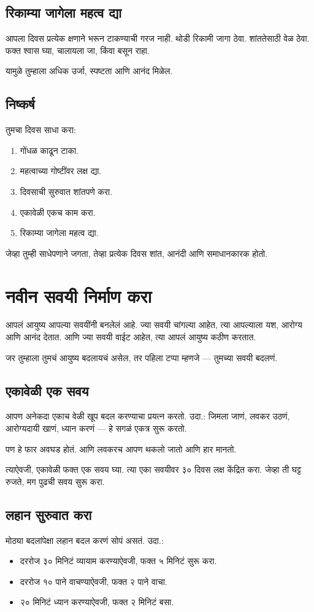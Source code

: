 \section*{रिकाम्या जागेला महत्व द्या}
आपला दिवस प्रत्येक क्षणाने भरून टाकण्याची गरज नाही.  
थोडी रिकामी जागा ठेवा.  
शांततेसाठी वेळ ठेवा.  
फक्त श्वास घ्या, चालायला जा, किंवा बसून राहा.  

यामुळे तुम्हाला अधिक उर्जा, स्पष्टता आणि आनंद मिळेल.  

\section*{निष्कर्ष}
तुमचा दिवस साधा करा:  
\begin{enumerate}
\item गोंधळ काढून टाका.  
\item महत्वाच्या गोष्टींवर लक्ष द्या.  
\item दिवसाची सुरुवात शांतपणे करा.  
\item एकावेळी एकच काम करा.  
\item रिकाम्या जागेला महत्व द्या.  
\end{enumerate}

जेव्हा तुम्ही साधेपणाने जगता,  
तेव्हा प्रत्येक दिवस शांत, आनंदी आणि समाधानकारक होतो.  



\chapter{नवीन सवयी निर्माण करा}

आपलं आयुष्य आपल्या सवयींनी बनलेलं आहे.  
ज्या सवयी चांगल्या आहेत, त्या आपल्याला यश, आरोग्य आणि आनंद देतात.  
आणि ज्या सवयी वाईट आहेत, त्या आपलं आयुष्य कठीण करतात.  

जर तुम्हाला तुमचं आयुष्य बदलायचं असेल,  
तर पहिला टप्पा म्हणजे — तुमच्या सवयी बदलणं.  

\section*{एकावेळी एक सवय}
आपण अनेकदा एकाच वेळी खूप बदल करण्याचा प्रयत्न करतो.  
उदा.:  
जिमला जाणं, लवकर उठणं,  
आरोग्यदायी खाणं, ध्यान करणं — हे सगळं एकत्र सुरू करतो.  

पण हे फार अवघड होतं.  
आणि लवकरच आपण थकलो जातो आणि हार मानतो.  

त्याऐवजी, एकावेळी फक्त एक सवय घ्या.  
त्या एका सवयीवर ३० दिवस लक्ष केंद्रित करा.  
जेव्हा ती घट्ट रुजते,  
मग पुढची सवय सुरू करा.  

\section*{लहान सुरुवात करा}
मोठ्या बदलांपेक्षा लहान बदल करणं सोपं असतं.  
उदा.:  
\begin{itemize}
\item दररोज ३० मिनिटं व्यायाम करण्याऐवजी, फक्त ५ मिनिटं सुरू करा.  
\item दररोज १० पाने वाचण्याऐवजी, फक्त २ पाने वाचा.  
\item २० मिनिटं ध्यान करण्याऐवजी, फक्त २ मिनिटं बसा.  
\end{itemize}

